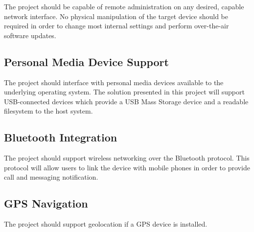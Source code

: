 The project should be capable of remote administration on any desired, capable network interface.
No physical manipulation of the target device should be required in order to change most internal settings and perform over-the-air software updates.

\subsection{Personal Media Device Support}

The project should interface with personal media devices available to the underlying operating system.
The solution presented in this project will support USB-connected devices which provide a USB Mass Storage device and a readable filesystem to the host system.

\subsection{Bluetooth Integration}

The project should support wireless networking over the Bluetooth protocol.
This protocol will allow users to link the device with mobile phones in order to provide call and messaging notification.

\subsection{GPS Navigation}

The project should support geolocation if a GPS device is installed.
